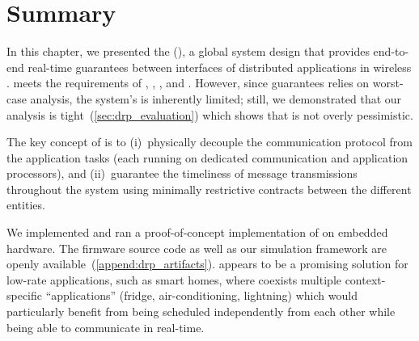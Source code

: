 \newpage
\section{Summary}

In this chapter, we presented the \DRPLong (\DRP), a global system design that provides end-to-end real-time guarantees between interfaces of distributed applications in wireless \CPS.
\DRP meets the requirements of , , , and .
However, since \DRP guarantees relies on worst-case analysis, the system's  is inherently limited; still, we demonstrated that our analysis is tight~(\cref{sec:drp_evaluation}) which shows that \DRP is not overly pessimistic.

The key concept of \DRP is to (i)~physically decouple the communication protocol from the application tasks (each running on dedicated communication and application processors), and (ii)~guarantee the timeliness of message transmissions throughout the system using minimally restrictive contracts between the different entities.

We implemented and ran a proof-of-concept implementation of \DRP on embedded hardware.
The firmware source code as well as our \DRP simulation framework are openly available~(\cref{append:drp_artifacts}).
\DRP appears to be a promising solution for low-rate applications, such as smart homes, where  coexists multiple context-specific ``applications'' (\eg fridge, air-conditioning, lightning) which would particularly benefit from being scheduled independently from each other while being able to communicate in real-time.
